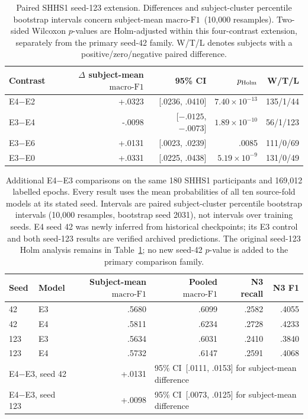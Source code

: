 \documentclass[10pt,a4paper]{article}
\newcommand{\mf}{\ensuremath{\mathrm{macro\text{-}F1}}}
\newcommand{\ci}{95\% CI}
\begin{document}
\begin{table}[H]
\centering\small
\caption{Paired SHHS1 seed-123 extension. Differences and subject-cluster percentile
bootstrap intervals concern subject-mean \mf\ (10,000 resamples). Two-sided Wilcoxon $p$-values
are Holm-adjusted within this four-contrast extension, separately from the primary seed-42 family.
W/T/L denotes subjects with a positive/zero/negative paired difference.}
\label{tab:sup_shhs_seed123_paired}
\begin{tabular}{lrrrr}
\toprule
Contrast & $\Delta$ subject-mean \mf & \ci & $p_{\rm Holm}$ & W/T/L \\
\midrule
E4$-$E2 & +.0323 & [.0236, .0410] & $7.40\times10^{-13}$ & 135/1/44 \\
E3$-$E4 & -.0098 & [$-.0125$, $-.0073$] & $1.89\times10^{-10}$ & 56/1/123 \\
E3$-$E6 & +.0131 & [.0023, .0239] & .0085 & 111/0/69 \\
E3$-$E0 & +.0331 & [.0225, .0438] & $5.19\times10^{-9}$ & 131/0/49 \\
\bottomrule
\end{tabular}
\end{table}

\begin{table}[H]
\centering\small
\caption{Additional E4$-$E3 comparisons on the same 180 SHHS1 participants and 169,012 labelled
epochs. Every result uses the mean probabilities of all ten source-fold models at its stated seed.
Intervals are paired subject-cluster percentile bootstrap intervals (10,000 resamples, bootstrap
seed 2031), not intervals over training seeds. E4 seed 42 was newly inferred from historical
checkpoints; its E3 control and both seed-123 results are verified archived predictions.
The original seed-123 Holm analysis remains in Table~\ref{tab:sup_shhs_seed123_paired}; no new
seed-42 $p$-value is added to the primary comparison family.}
\label{tab:sup_e4_two_seeds}
\begin{tabular}{llrrrr}
\toprule
Seed & Model & Subject-mean \mf & Pooled \mf & N3 recall & N3 F1 \\
\midrule
42 & E3 & .5680 & .6099 & .2582 & .4055 \\
42 & E4 & .5811 & .6234 & .2728 & .4233 \\
123 & E3 & .5634 & .6031 & .2410 & .3840 \\
123 & E4 & .5732 & .6147 & .2591 & .4068 \\
\midrule
\multicolumn{2}{l}{E4$-$E3, seed 42} & +.0131 & \multicolumn{3}{l}{\ci\ [.0111, .0153] for subject-mean difference} \\
\multicolumn{2}{l}{E4$-$E3, seed 123} & +.0098 & \multicolumn{3}{l}{\ci\ [.0073, .0125] for subject-mean difference} \\
\bottomrule
\end{tabular}
\end{table}
\end{document}
